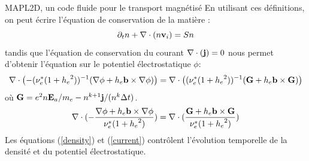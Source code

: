 \documentclass[a4paper,11pt]{article} %
\begin{document}
\begin{section}{MAPL2D, un code fluide pour le transport magnétisé}
En utilisant ces définitions, on peut écrire l'équation de conservation de la matière :
\begin{equation}
\label{density}\partial_t n+\mathbf{\nabla}\cdot(n\mathbf{v}_i)=Sn
\end{equation}
tandis que l'équation de conservation du courant $\nabla\cdot(\mathbf{j})=0$ nous permet d'obtenir l'équation sur le 
potentiel électrostatique $\phi$:
\begin{equation}
\label{current}\mathbf{\nabla}\cdot\left(-(\nu_e^*(1+{h_e}^2))^{-1}(\mathbf{\nabla\phi}+h_e\mathbf{b}\times\mathbf{\nabla\phi})\right)=
\mathbf{\nabla}\cdot\left((\nu_e^*(1+{h_e}^2))^{-1}(\mathbf{G}+h_e\mathbf{b}\times\mathbf{G})\right)
\end{equation}
où $\mathbf{G}=e^2n\mathbf{E}_a/m_e-n^{k+1}\mathbf{j}/(n^k\Delta t)$. 
$$\mathbf{\nabla}\cdot(-\frac{\mathbf{\nabla\phi}+h_e\mathbf{b}\times\mathbf{\nabla\phi}}{\nu_e^*(1+{h_e}^2)})=
\mathbf{\nabla}\cdot(\frac{\mathbf{G}+h_e\mathbf{b}\times\mathbf{G}}{\nu_e^*(1+{h_e}^2)})$$
Les équations (\ref{density}) et (\ref{current}) contrôlent l'évolution temporelle de la densité et du potentiel 
électrostatique.
\end{section}
\end{document}
